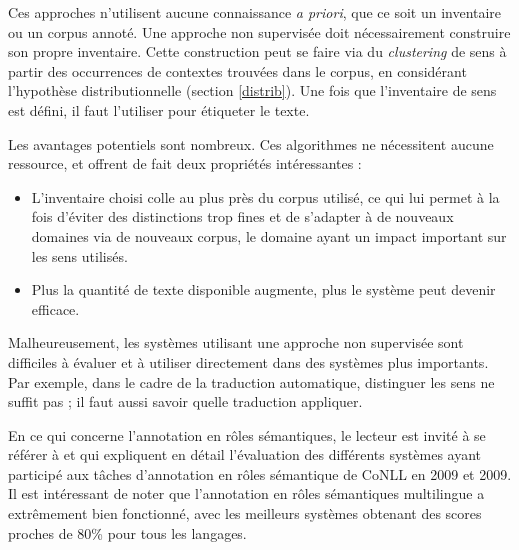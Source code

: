 Ces approches n'utilisent aucune connaissance \textit{a priori}, que ce soit un
inventaire ou un corpus annoté. Une approche non supervisée doit nécessairement
construire son propre inventaire. Cette construction peut se faire via du
\textit{clustering} de sens à partir des occurrences de contextes trouvées dans
le corpus, en considérant l'hypothèse distributionnelle (section
\ref{distrib}). Une fois que l'inventaire de sens est défini, il faut
l'utiliser pour étiqueter le texte.

Les avantages potentiels sont nombreux. Ces algorithmes ne nécessitent aucune
ressource, et offrent de fait deux propriétés intéressantes :

\begin{itemize}

    \item L'inventaire choisi colle au plus près du corpus utilisé, ce qui lui
        permet à la fois d'éviter des distinctions trop fines et de s'adapter à
        de nouveaux domaines via de nouveaux corpus, le domaine ayant un impact
        important sur les sens utilisés.

    \item Plus la quantité de texte disponible augmente, plus le système peut
        devenir efficace.

\end{itemize}

Malheureusement, les systèmes utilisant une approche non supervisée sont
difficiles à évaluer et à utiliser directement dans des systèmes plus
importants. Par exemple, dans le cadre de la traduction automatique, distinguer
les sens ne suffit pas ; il faut aussi savoir quelle traduction appliquer.

En ce qui concerne l'annotation en rôles sémantiques, le lecteur est invité à
se référer à \citep{surdeanu2008conll} et \citep{hajic2009conll} qui expliquent
en détail l'évaluation des différents systèmes ayant participé aux tâches
d'annotation en rôles sémantique de CoNLL en 2009 et 2009. Il est intéressant
de noter que l'annotation en rôles sémantiques multilingue a extrêmement bien
fonctionné, avec les meilleurs systèmes obtenant des scores proches de 80\%
pour tous les langages.


